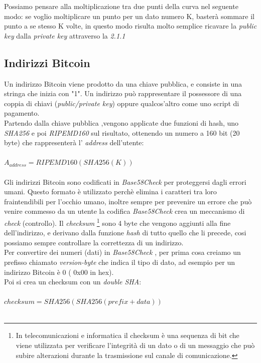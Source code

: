 Possiamo pensare alla moltiplicazione tra due punti della curva nel seguente modo:
se voglio moltiplicare un punto per un dato numero K, baster\`a sommare il punto a se stesso K volte, in questo modo risulta molto semplice ricavare la \textit{public key} dalla \textit{private key} attraverso la \textit{2.1.1}\\


\subsection{Indirizzi Bitcoin}
\label{sec:sezioni}
Un indirizzo Bitcoin  viene prodotto da una chiave pubblica, e consiste in una stringa che inizia con "1". Un indirizzo  pu\`o rappresentare il possessore di una coppia di chiavi (\textit{public/private key}) oppure qualcos'altro come uno script di pagamento.\\
Partendo dalla chiave pubblica ,vengono applicate due funzioni di hash,  uno \textit{SHA256} e poi \textit{RIPEMD160} sul risultato, ottenendo un numero a 160 bit (20 byte) che rappresenter\`a l' \textit{address} dell'utente:\\\\
$ A_{address}=RIPEMD160(SHA256(K))$\\\\
Gli indirizzi Bitcoin sono codificati in \textit{Base58Check} per proteggersi dagli errori umani. Questo formato \`e utilizzato perch\`e elimina i caratteri tra loro fraintendibili per l'occhio umano, inoltre sempre per prevenire un errore che pu\`o venire commesso da un utente la codifica \textit{Base58Check} crea un meccanismo di \textit{check} (controllo). Il \textit{checksum} \footnote{In telecomunicazioni e informatica il checksum  \`e una sequenza di bit che viene utilizzata per verificare l'integrit\`a di un dato o di un messaggio che pu\`o subire alterazioni durante la trasmissione sul canale di comunicazione.} sono 4 byte che vengono aggiunti alla fine dell'indirizzo, e derivano dalla funzione \textit{hash} di tutto quello che li precede, cosi possiamo sempre controllare la correttezza di un indirizzo.\\
Per convertire dei numeri (dati) in \textit{Base58Check} , per prima cosa creiamo un prefisso chiamato \textit{version-byte} che indica il tipo di dato, ad esempio per un indirizzo Bitcoin \`e 0 ( 0x00 in hex).\\
Poi si crea un checksum con un \textit{double SHA}:\\\\
$checksum=SHA256(SHA256(prefix+data))$\\\\
